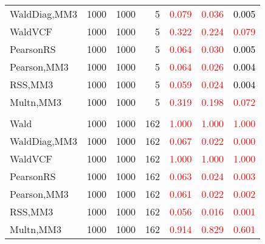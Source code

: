 \documentclass[
]{article}
\begin{document}
\begin{table}[H]
{\begin{tabular}[t]{lrrrrrr}
\hspace{1em}WaldDiag,MM3 & 1000 & 1000 & 5 & \textcolor{red}{0.079} & \textcolor{red}{0.036} & \textcolor{black}{0.005}\\
\hspace{1em}WaldVCF & 1000 & 1000 & 5 & \textcolor{red}{0.322} & \textcolor{red}{0.224} & \textcolor{red}{0.079}\\
\hspace{1em}PearsonRS & 1000 & 1000 & 5 & \textcolor{red}{0.064} & \textcolor{red}{0.030} & \textcolor{black}{0.005}\\
\hspace{1em}Pearson,MM3 & 1000 & 1000 & 5 & \textcolor{red}{0.064} & \textcolor{red}{0.026} & \textcolor{black}{0.004}\\
\hspace{1em}RSS,MM3 & 1000 & 1000 & 5 & \textcolor{red}{0.059} & \textcolor{red}{0.024} & \textcolor{black}{0.004}\\
\hspace{1em}Multn,MM3 & 1000 & 1000 & 5 & \textcolor{red}{0.319} & \textcolor{red}{0.198} & \textcolor{red}{0.072}\\
\addlinespace[0.3em]
\multicolumn{7}{l}{\textbf{1F 15V}}\\
\hspace{1em}Wald & 1000 & 1000 & 162 & \textcolor{red}{1.000} & \textcolor{red}{1.000} & \textcolor{red}{1.000}\\
\hspace{1em}WaldDiag,MM3 & 1000 & 1000 & 162 & \textcolor{red}{0.067} & \textcolor{red}{0.022} & \textcolor{red}{0.000}\\
\hspace{1em}WaldVCF & 1000 & 1000 & 162 & \textcolor{red}{1.000} & \textcolor{red}{1.000} & \textcolor{red}{1.000}\\
\hspace{1em}PearsonRS & 1000 & 1000 & 162 & \textcolor{red}{0.063} & \textcolor{red}{0.024} & \textcolor{red}{0.003}\\
\hspace{1em}Pearson,MM3 & 1000 & 1000 & 162 & \textcolor{red}{0.061} & \textcolor{red}{0.022} & \textcolor{red}{0.002}\\
\hspace{1em}RSS,MM3 & 1000 & 1000 & 162 & \textcolor{red}{0.056} & \textcolor{red}{0.016} & \textcolor{red}{0.001}\\
\hspace{1em}Multn,MM3 & 1000 & 1000 & 162 & \textcolor{red}{0.914} & \textcolor{red}{0.829} & \textcolor{red}{0.601}\\

\end{tabular}}
\end{table}
\end{document}
